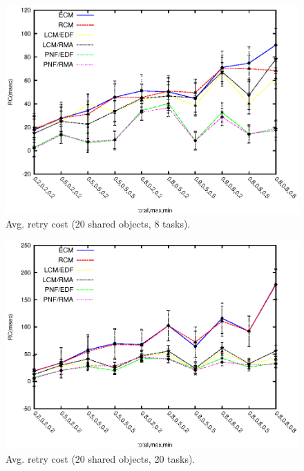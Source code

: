\documentclass[twocolumn]{article}
\begin{document}
\begin{figure}[h]
\centering
\includegraphics[scale=0.7]{figures/Abr_dur_8t_90obj_100wr}
\caption{Avg. retry cost (20 shared objects, 8 tasks).}
\label{fig-RC-pnf-8t}
\end{figure}

\begin{figure}[h]
\centering
\includegraphics[scale=0.7]{figures/Abr_dur_20t_210obj_100wr}
\caption{Avg. retry cost (20 shared objects, 20 tasks).}
\label{fig-RC-pnf-20t-20obj}
\end{figure}
\end{document}
